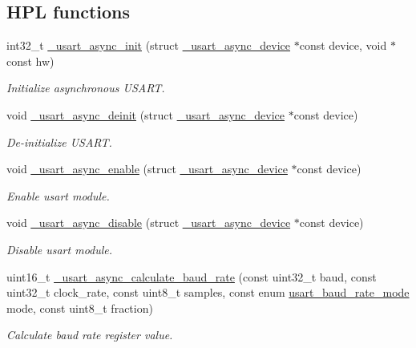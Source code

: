 \subsection*{H\+PL functions}
\begin{DoxyCompactItemize}
\item 
int32\+\_\+t \hyperlink{group___h_p_l_ga11745e0bd0c9d636afbefae8e209665e}{\+\_\+usart\+\_\+async\+\_\+init} (struct \hyperlink{struct__usart__async__device}{\+\_\+usart\+\_\+async\+\_\+device} $\ast$const device, void $\ast$const hw)
\begin{DoxyCompactList}\small\item\em Initialize asynchronous U\+S\+A\+RT. \end{DoxyCompactList}\item 
void \hyperlink{group___h_p_l_ga57e2ef9f6ec11c53a9d88bdb7a82aac4}{\+\_\+usart\+\_\+async\+\_\+deinit} (struct \hyperlink{struct__usart__async__device}{\+\_\+usart\+\_\+async\+\_\+device} $\ast$const device)
\begin{DoxyCompactList}\small\item\em De-\/initialize U\+S\+A\+RT. \end{DoxyCompactList}\item 
void \hyperlink{group___h_p_l_ga86c4101798d9dbc584f1e56615140d6f}{\+\_\+usart\+\_\+async\+\_\+enable} (struct \hyperlink{struct__usart__async__device}{\+\_\+usart\+\_\+async\+\_\+device} $\ast$const device)
\begin{DoxyCompactList}\small\item\em Enable usart module. \end{DoxyCompactList}\item 
void \hyperlink{group___h_p_l_gadb6751e5c270eb88eb754f45e7b8a91f}{\+\_\+usart\+\_\+async\+\_\+disable} (struct \hyperlink{struct__usart__async__device}{\+\_\+usart\+\_\+async\+\_\+device} $\ast$const device)
\begin{DoxyCompactList}\small\item\em Disable usart module. \end{DoxyCompactList}\item 
uint16\+\_\+t \hyperlink{group___h_p_l_gab834a3310b05b1118ac7cf5ad90835ba}{\+\_\+usart\+\_\+async\+\_\+calculate\+\_\+baud\+\_\+rate} (const uint32\+\_\+t baud, const uint32\+\_\+t clock\+\_\+rate, const uint8\+\_\+t samples, const enum \hyperlink{group___h_p_l_ga59141b5eb86f4d53f17bbeab1d7c83e7}{usart\+\_\+baud\+\_\+rate\+\_\+mode} mode, const uint8\+\_\+t fraction)
\begin{DoxyCompactList}\small\item\em Calculate baud rate register value. \end{DoxyCompactList}\item 

\end{DoxyCompactItemize}
